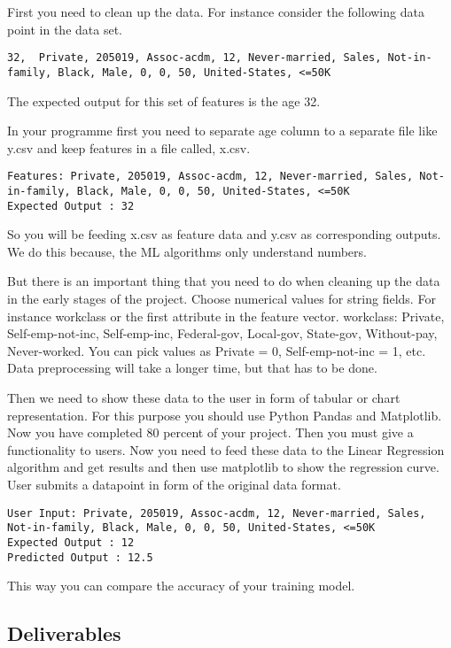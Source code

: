 First you need to clean up the data. For instance consider the following data point in the data set. 

\begin{lstlisting}
32,  Private, 205019, Assoc-acdm, 12, Never-married, Sales, Not-in-family, Black, Male, 0, 0, 50, United-States, <=50K
\end{lstlisting}

The expected output for this set of features is the age 32.

In your programme first you need to separate age column to a separate
file like y.csv and keep features in a file called, x.csv.
\begin{lstlisting}
Features: Private, 205019, Assoc-acdm, 12, Never-married, Sales, Not-in-family, Black, Male, 0, 0, 50, United-States, <=50K
Expected Output : 32
\end{lstlisting}

So you will be feeding x.csv as feature data and y.csv as
corresponding outputs. We do this because, the ML algorithms only
understand numbers.

But there is an important thing that you need to do when cleaning up
the data in the early stages of the project. Choose numerical values
for string fields.  For instance workclass or the first attribute in
the feature vector.  workclass: Private, Self-emp-not-inc,
Self-emp-inc, Federal-gov, Local-gov, State-gov, Without-pay,
Never-worked.  You can pick values as Private = 0, Self-emp-not-inc =
1, etc. Data preprocessing will take a longer time, but that has to be done. 


Then we need to show these data to the user in form of tabular or
chart representation. For this purpose you should use Python Pandas
and Matplotlib.  Now you have completed 80 percent of your
project. Then you must give a functionality to users. Now you need to
feed these data to the Linear Regression algorithm and get results and
then use matplotlib to show the regression curve. User submits a datapoint
in form of the original data format.

\begin{lstlisting}
User Input: Private, 205019, Assoc-acdm, 12, Never-married, Sales, Not-in-family, Black, Male, 0, 0, 50, United-States, <=50K
Expected Output : 12
Predicted Output : 12.5
\end{lstlisting}

This way you can compare the accuracy of your training model.


\subsection{Deliverables}

